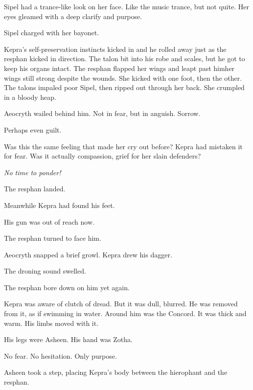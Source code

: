 \documentclass
  [a4paper,
   12pt,
   oneside
  ]%
  {article}
\begin{document}
Sipel had a trance-like look on her face.
Like the music trance, but not quite.
Her eyes gleamed with a deep clarify and purpose.

Sipel charged with her bayonet. 

Kepra's self-preservation instincts kicked in and he rolled away just as the resphan kicked in direction. 
The talon bit into his robe and scales, but he got to keep his organs intact.
The resphan flapped her wings and leapt past him\dash{}her wings still strong despite the wounds. 
She kicked with one foot, then the other.
The talons impaled poor Sipel, then ripped out through her back. 
She crumpled in a bloody heap.

Aeocryth wailed behind him. 
Not in fear, but in anguish.
Sorrow. 

Perhaps even guilt.

Was this the same feeling that made her cry out before? Kepra had mistaken it for fear. Was it actually compassion, grief for her slain defenders?

\emph{No time to ponder!}

The resphan landed. 

Meanwhile Kepra had found his feet. 

His gun was out of reach now. 

The resphan turned to face him. 

Aeocryth snapped a brief growl.
Kepra drew his dagger. 

The droning sound swelled.

The resphan bore down on him yet again.

Kepra was aware of clutch of dread.
But it was dull, blurred. He was removed from it, as if swimming in water. 
Around him was the Concord. 
It was thick and warm. 
His limbs moved with it. 

His legs were Asheen. 
His hand was Zotha. 

No fear. 
No hesitation.
Only purpose.

Asheen took a step, placing Kepra's body between the hierophant and the resphan.
\end{document}
